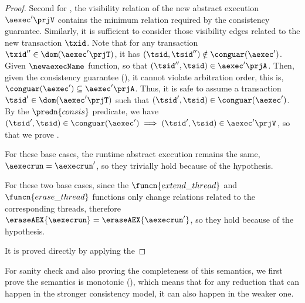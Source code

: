 \begin{proof}
Second for , the visibility relation of the new abstract execution \( \aexec'\prjV \) contains the minimum relation required by the consistency guarantee.
Similarly, it is sufficient to consider those visibility edges related to the new transaction \( \txid \).
Note that for any transaction \( \txid'' \in \dom(\aexec'\prjT) \), it has \( (\tsid, \tsid'') \notin \conguar(\aexec') \).
Given \( \newaexecName \) function, so that \( (\tsid'', \tsid) \in \aexec'\prjA \).
Then, given the consistency guarantee (), it cannot violate arbitration order, this is, \( \conguar(\aexec') \subseteq \aexec'\prjA\).
Thus, it is safe to assume a transaction \( \tsid' \in \dom(\aexec'\prjT) \) such that \( (\tsid', \tsid) \in \conguar(\aexec') \).
By the \( \predn{consis}\) predicate, we have \( (\tsid', \tsid) \in \conguar(\aexec') \implies (\tsid', \tsid) \in \aexec'\prjV\), so that we prove .


For these base cases, the runtime abstract execution remains the same, \ie \( \aexecrun = \aexecrun' \), so they trivially hold because of the hypothesis.


For these two base cases, since the \( \funcn{extend\_thread} \)  and \( \funcn{erase\_thread} \) functions only change relations related to the corresponding threads, therefore \ie \( \eraseAEX{\aexecrun} = \eraseAEX{\aexecrun'} \), so they hold because of the hypothesis.


It is proved directly by applying the \ih
\end{proof}

For sanity check and also proving the completeness of this semantics, we first prove the semantics is monotonic (), which means that for any reduction that can happen in the stronger consistency model, it can also happen in the weaker one.

